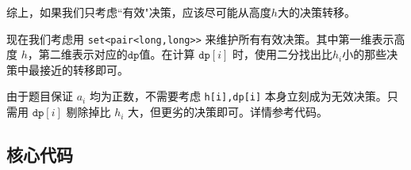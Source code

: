 综上，如果我们只考虑``有效"决策，应该尽可能从高度$h$大的决策转移。

现在我们考虑用 \texttt{set<pair<long,long>>} 来维护所有有效决策。其中第一维表示高度 $h$，第二维表示对应的$\texttt{dp}$值。在计算 $\texttt{dp}[i]$ 时，使用二分找出比$h_{i}$小的那些决策中最接近的转移即可。

由于题目保证 $a_i$ 均为正数，不需要考虑 \texttt{{h[i],dp[i]}} 本身立刻成为无效决策。只需用 $\texttt{dp}[i]$ 剔除掉比  $h_i$ 大，但更劣的决策即可。详情参考代码。





\subsection*{核心代码}
\inputminted[linenos,autogobble]{cpp}{./Code/Q.cpp}
\newpage